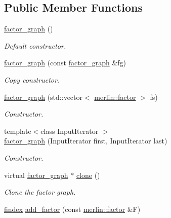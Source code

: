 \subsection*{Public Member Functions}
\begin{DoxyCompactItemize}
\item 
\hypertarget{classmerlin_1_1factor__graph_a6a662ba842145071605d68e998e45a98}{}\hyperlink{classmerlin_1_1factor__graph_a6a662ba842145071605d68e998e45a98}{factor\+\_\+graph} ()\label{classmerlin_1_1factor__graph_a6a662ba842145071605d68e998e45a98}

\begin{DoxyCompactList}\small\item\em Default constructor. \end{DoxyCompactList}\item 
\hyperlink{classmerlin_1_1factor__graph_ad7a6caf6041a1911e3afa977c4c9f06c}{factor\+\_\+graph} (const \hyperlink{classmerlin_1_1factor__graph}{factor\+\_\+graph} \&fg)
\begin{DoxyCompactList}\small\item\em Copy constructor. \end{DoxyCompactList}\item 
\hyperlink{classmerlin_1_1factor__graph_aca43685fab01370871b8074c3e03dbd2}{factor\+\_\+graph} (std\+::vector$<$ \hyperlink{classmerlin_1_1factor}{merlin\+::factor} $>$ fs)
\begin{DoxyCompactList}\small\item\em Constructor. \end{DoxyCompactList}\item 
{\footnotesize template$<$class Input\+Iterator $>$ }\\\hyperlink{classmerlin_1_1factor__graph_a9f5604018fec35a52f098203833f7618}{factor\+\_\+graph} (Input\+Iterator first, Input\+Iterator last)
\begin{DoxyCompactList}\small\item\em Constructor. \end{DoxyCompactList}\item 
virtual \hyperlink{classmerlin_1_1factor__graph}{factor\+\_\+graph} $\ast$ \hyperlink{classmerlin_1_1factor__graph_a485d9039df843d2db668782ac9c90c8a}{clone} ()
\begin{DoxyCompactList}\small\item\em Clone the factor graph. \end{DoxyCompactList}\item 
\hyperlink{classmerlin_1_1factor__graph_a533556bd4ec6961b63a91a80a8a37508}{findex} \hyperlink{classmerlin_1_1factor__graph_a8d6b1a20187d5d981e749379bf24474f}{add\+\_\+factor} (const \hyperlink{classmerlin_1_1factor}{merlin\+::factor} \&F)

\end{DoxyCompactItemize}
